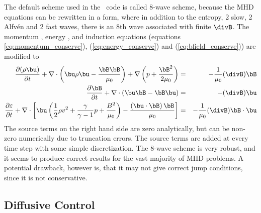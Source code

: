 The default scheme used in the \BATSRUS\ code is called 8-wave scheme,
because the MHD equations can be rewritten in a form, where in addition
to the entropy, 2 slow, 2 Alfv\'en and 2 fast waves, there is an 8th 
wave associated with finite $\divB$. The momentum , 
energy , and induction 
equations 
 (equations \ref{eq:momentum_conserve}), (\ref{eq:energy_conserve}) 
and (\ref{eq:bfield_conserve}))
are modified to
\begin{eqnarray}
  \frac{\partial (\rho\bu)}{\partial t}+
      \nabla\cdot\left(\bu\rho\bu - \frac{\bB\bB}{\mu_0}\right) + 
      \nabla\left(p + \frac{\bB^2}{2\mu_0}\right)
      &=& -\frac{1}{\mu_0}(\divB)\bB                    \label{q-momentum8} \\
  \frac{\partial\bB}{\partial t} + \nabla\cdot(\bu\bB - \bB\bu)
      &=& -(\divB)\bu                    \label{q-induction8} \\
  \frac{\partial\varepsilon}{\partial t}+
      \nabla \cdot \left[ \bu \left( \frac12 \rho v^2 + 
      \frac{\gamma}{\gamma-1} p +
      \frac{B^2}{\mu_0} \right) - 
      \frac{\left(\bu\cdot\bB\right)\bB}{\mu_0}\right] 
      &=& -\frac{1}{\mu_0}(\divB)\bB\cdot\bu           \label{q-energy8}
\end{eqnarray}
The source terms on the right hand side are zero analytically, but
can be non-zero numerically due to truncation errors. The source
terms are added at every time step with some simple discretization.
The 8-wave scheme is very robust, and it seems to produce correct
results for the vast majority of MHD problems. A potential drawback,
however is, that it may not give correct jump conditions, since it
is not conservative.

\subsection{Diffusive Control \label{section:diffusive_control}}


